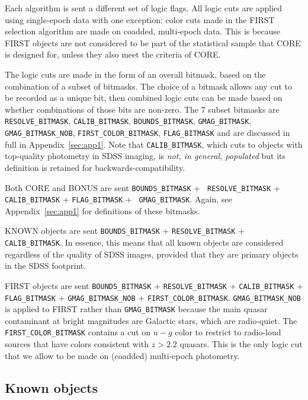 \documentclass{emulateapj}
\begin{document}
Each algorithm is sent a different set of logic flags. All logic cuts
are applied using single-epoch data with one exception: color cuts made
in the FIRST selection algorithm are made on coadded, multi-epoch data.
This is because FIRST objects are not considered to be part of the
statistical sample that CORE is designed for, unless they also meet the
criteria of CORE.

The logic cuts are made in the form of an overall bitmask, based on the
combination of a subset of bitmasks. The choice of a bitmask allows
any cut to be recorded as a unique bit, then combined logic cuts can
be made based on whether combinations of those bits are non-zero. The
7 subset bitmasks are {\tt RESOLVE\_BITMASK}, {\tt CALIB\_BITMASK},
{\tt BOUNDS\_BITMASK}, {\tt GMAG\_BITMASK}, {\tt GMAG\_BITMASK\_NOB},
{\tt FIRST\_COLOR\_BITMASK}, {\tt FLAG\_BITMASK} and are discussed
in full in Appendix~\ref{sec:app1}. Note that {\tt CALIB\_BITMASK},
which cuts to objects with top-quality photometry in SDSS imaging, is
{\em not, in general, populated} but its definition is retained for
backwards-compatibility.

Both CORE and BONUS are sent {\tt BOUNDS\_BITMASK} + {\tt
RESOLVE\_BITMASK} + {\tt CALIB\_BITMASK} + {\tt FLAG\_BITMASK} + {\tt
GMAG\_BITMASK}. Again, see Appendix~\ref{sec:app1} for definitions of
these bitmasks.

KNOWN objects are sent {\tt BOUNDS\_BITMASK} + {\tt RESOLVE\_BITMASK} +
{\tt CALIB\_BITMASK}. In essence, this means that all known objects are
considered regardless of the quality of SDSS images, provided that they
are primary objects in the SDSS footprint.

FIRST objects are sent {\tt BOUNDS\_BITMASK} + {\tt RESOLVE\_BITMASK} +
{\tt CALIB\_BITMASK} + {\tt FLAG\_BITMASK} + {\tt GMAG\_BITMASK\_NOB}
+ {\tt FIRST\_COLOR\_BITMASK}. {\tt GMAG\_BITMASK\_NOB} is applied
to FIRST rather than {\tt GMAG\_BITMASK} because the main quasar
contaminant at bright magnitudes are Galactic stars, which are
radio-quiet. The {\tt FIRST\_COLOR\_BITMASK} contains a cut on $u-g$
color to restrict to radio-loud sources that have colors consistent with
$z > 2.2$ quasars. This is the only logic cut that we allow to be made
on (coadded) multi-epoch photometry.


\subsection{Known objects}
\end{document}

